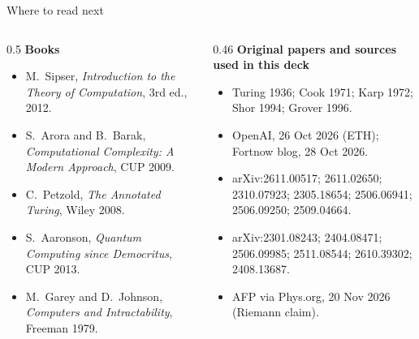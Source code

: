 \begin{frame}{Where to read next}
\begin{columns}[T]
\begin{column}{0.5\textwidth}
\small
\textbf{Books}
\begin{itemize}\setlength\itemsep{1mm}
\item M.\ Sipser, \emph{Introduction to the Theory of Computation}, 3rd ed., 2012.
\item S.\ Arora and B.\ Barak, \emph{Computational Complexity: A Modern Approach}, CUP 2009.
\item C.\ Petzold, \emph{The Annotated Turing}, Wiley 2008.
\item S.\ Aaronson, \emph{Quantum Computing since Democritus}, CUP 2013.
\item M.\ Garey and D.\ Johnson, \emph{Computers and Intractability}, Freeman 1979.
\end{itemize}
\end{column}
\begin{column}{0.46\textwidth}
\small
\textbf{Original papers and sources used in this deck}
\begin{itemize}\setlength\itemsep{1mm}
\item Turing 1936; Cook 1971; Karp 1972; Shor 1994; Grover 1996.
\item OpenAI, 26 Oct 2026 (ETH); Fortnow blog, 28 Oct 2026.
\item arXiv:2611.00517; 2611.02650; 2310.07923; 2305.18654; 2506.06941; 2506.09250; 2509.04664.
\item arXiv:2301.08243; 2404.08471; 2506.09985; 2511.08544; 2610.39302; 2408.13687.
\item AFP via Phys.org, 20 Nov 2026 (Riemann claim).
\end{itemize}
\end{column}
\end{columns}
\end{frame}

